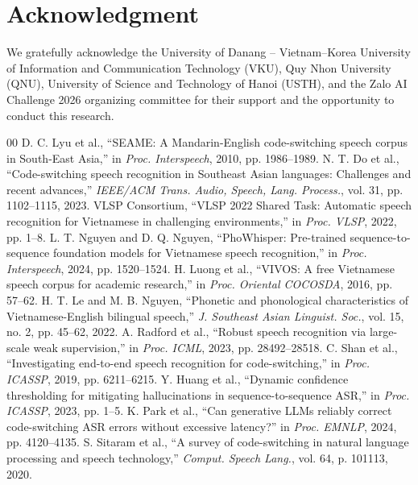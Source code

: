 \documentclass[9pt, conference, a4paper, compsocconf]{IEEEtran}
\begin{document}
\section*{Acknowledgment}
We gratefully acknowledge the University of Danang -- Vietnam–Korea University of Information and Communication Technology (VKU), Quy Nhon University (QNU), University of Science and Technology of Hanoi (USTH), and the Zalo AI Challenge 2026 organizing committee for their support and the opportunity to conduct this research.

\begin{thebibliography}{00}
 D. C. Lyu et al., ``SEAME: A Mandarin-English code-switching speech corpus in South-East Asia,'' in \textit{Proc. Interspeech}, 2010, pp. 1986--1989.
 N. T. Do et al., ``Code-switching speech recognition in Southeast Asian languages: Challenges and recent advances,'' \textit{IEEE/ACM Trans. Audio, Speech, Lang. Process.}, vol. 31, pp. 1102--1115, 2023.
 VLSP Consortium, ``VLSP 2022 Shared Task: Automatic speech recognition for Vietnamese in challenging environments,'' in \textit{Proc. VLSP}, 2022, pp. 1--8.
 L. T. Nguyen and D. Q. Nguyen, ``PhoWhisper: Pre-trained sequence-to-sequence foundation models for Vietnamese speech recognition,'' in \textit{Proc. Interspeech}, 2024, pp. 1520--1524.
 H. Luong et al., ``VIVOS: A free Vietnamese speech corpus for academic research,'' in \textit{Proc. Oriental COCOSDA}, 2016, pp. 57--62.
 H. T. Le and M. B. Nguyen, ``Phonetic and phonological characteristics of Vietnamese-English bilingual speech,'' \textit{J. Southeast Asian Linguist. Soc.}, vol. 15, no. 2, pp. 45--62, 2022.
 A. Radford et al., ``Robust speech recognition via large-scale weak supervision,'' in \textit{Proc. ICML}, 2023, pp. 28492--28518.
 C. Shan et al., ``Investigating end-to-end speech recognition for code-switching,'' in \textit{Proc. ICASSP}, 2019, pp. 6211--6215.
 Y. Huang et al., ``Dynamic confidence thresholding for mitigating hallucinations in sequence-to-sequence ASR,'' in \textit{Proc. ICASSP}, 2023, pp. 1--5.
 K. Park et al., ``Can generative LLMs reliably correct code-switching ASR errors without excessive latency?'' in \textit{Proc. EMNLP}, 2024, pp. 4120--4135.
 S. Sitaram et al., ``A survey of code-switching in natural language processing and speech technology,'' \textit{Comput. Speech Lang.}, vol. 64, p. 101113, 2020.

\end{thebibliography}
\end{document}
